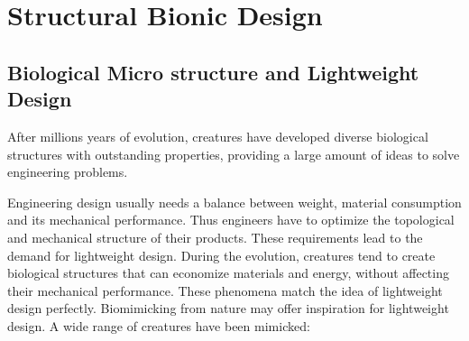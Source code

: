 
\chapter{Structural Bionic Design}



\section{Biological Micro structure and Lightweight Design}
After millions years of evolution, creatures have developed diverse biological structures with outstanding properties, providing a large amount of ideas to solve engineering problems. 

Engineering design usually needs a balance between weight, material consumption and its mechanical performance. Thus engineers have to optimize the topological and mechanical structure of their products. These requirements lead to the demand for lightweight design. During the evolution, creatures tend to create biological structures that can economize materials and energy, without affecting their mechanical performance. These phenomena match the idea of lightweight design perfectly. Biomimicking from nature may offer inspiration for lightweight design. A wide range of creatures have been mimicked:\\
